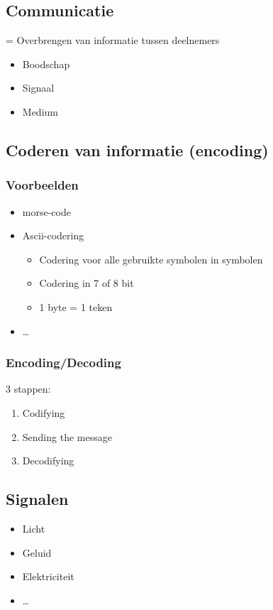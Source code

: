 \documentclass{article}
\begin{document}
\subsection{Communicatie}
= Overbrengen van informatie tussen deelnemers
\begin{itemize}
    \item Boodschap
    \item Signaal
    \item Medium
\end{itemize}

\subsection{Coderen van informatie (encoding)}
\subsubsection{Voorbeelden}
\begin{itemize}
    \item morse-code
    \item Ascii-codering
    \begin{itemize}
        \item Codering voor alle gebruikte symbolen in symbolen
        \item Codering in 7 of 8 bit
        \item 1 byte = 1 teken
    \end{itemize}
    \item \dots
\end{itemize}
  
\subsubsection{Encoding/Decoding}
3 stappen:
\begin{enumerate}
    \item Codifying
    \item Sending the message
    \item Decodifying
\end{enumerate}

\subsection{Signalen}
\begin{itemize}
    \item Licht
    \item Geluid
    \item Elektriciteit
    \item \dots
\end{itemize}
\end{document}
